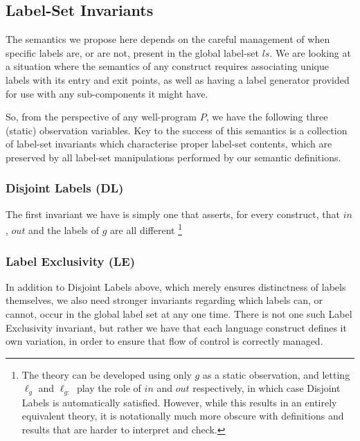 \subsection{Label-Set Invariants}

The semantics we propose here depends on the careful management
of when specific labels are, or are not,
present in the global label-set $ls$.
We are looking at a situation where the semantics of any construct
requires associating unique labels with its entry and exit points,
as well as having a label generator provided for use with any sub-components
it might have.

So, from the perspective of any well-program $P$,
we have the following three (static) observation variables.
Key to the success of this semantics is a collection of label-set invariants
which characterise proper label-set contents,
which are preserved by all label-set manipulations performed
by our semantic definitions.

\subsubsection{Disjoint Labels (DL)}\label{sssec:disjoint-labels}

The first invariant we have is simply one that asserts,
for every construct, that $in$, $out$ and the labels of $g$
are all different
\footnote{The theory can be developed using only $g$ as a static observation,
and letting $\ell_g$ and $\ell_{g:}$ play the role of $in$ and $out$
respectively, in which case Disjoint Labels is automatically satisfied.
However, while this results in an entirely equivalent theory,
it is notationally much more obscure
with definitions and results that are harder to interpret and check.
}%



\subsubsection{Label Exclusivity (LE)}\label{sssec:label-exclusivity}

In addition to Disjoint Labels above,
which merely ensures distinctness of labels themselves,
we also need stronger invariants regarding which labels can, or cannot,
occur in the global label set at any one time.
There is not one such Label Exclusivity invariant,
but rather we have that each language construct defines it own
variation, in order to ensure that flow of control is correctly managed.

